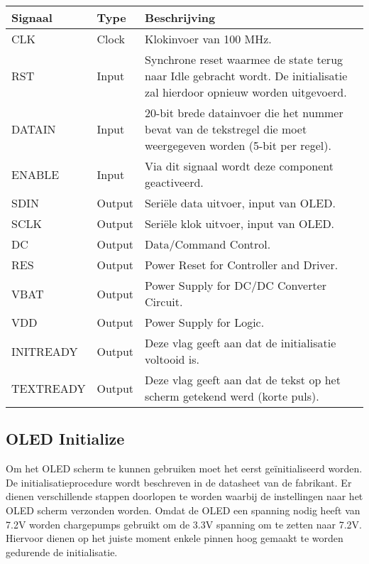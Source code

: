 		\begin{table}[H]
			\begin{tabular}{p{} p{} p{}}
				\toprule
				\textbf{Signaal} & \textbf{Type} & \textbf{Beschrijving} \\
				\midrule
				CLK & Clock & Klokinvoer van 100 MHz. \\
				RST & Input & Synchrone reset waarmee de state terug naar Idle gebracht wordt. De initialisatie zal hierdoor opnieuw worden uitgevoerd. \\
				DATA\textunderscore IN & Input & 20-bit brede datainvoer die het nummer bevat van de tekstregel die moet weergegeven worden (5-bit per regel). \\
				ENABLE & Input & Via dit signaal wordt deze component geactiveerd. \\
				SDIN & Output & Seri\"ele data uitvoer, input van OLED. \\
				SCLK & Output & Seri\"ele klok uitvoer, input van OLED. \\
				DC & Output & Data/Command Control. \\
				RES & Output & Power Reset for Controller and Driver. \\
				VBAT & Output & Power Supply for DC/DC Converter Circuit. \\
				VDD & Output & Power Supply for Logic. \\
				INIT\textunderscore READY & Output & Deze vlag geeft aan dat de initialisatie voltooid is. \\
				TEXT\textunderscore READY & Output & Deze vlag geeft aan dat de tekst op het scherm getekend werd (korte puls). \\
				\bottomrule 
			\end{tabular} 
		\end{table}

 	\subsection{OLED Initialize}
 		
 		\par Om het OLED scherm te kunnen gebruiken moet het eerst ge\"initialiseerd worden. De initialisatieprocedure wordt beschreven in de datasheet van de fabrikant. Er dienen verschillende stappen doorlopen te worden waarbij de instellingen naar het OLED scherm verzonden worden. Omdat de OLED een spanning nodig heeft van 7.2V worden chargepumps gebruikt om de 3.3V spanning om te zetten naar 7.2V. Hiervoor dienen op het juiste moment enkele pinnen hoog gemaakt te worden gedurende de initialisatie.


